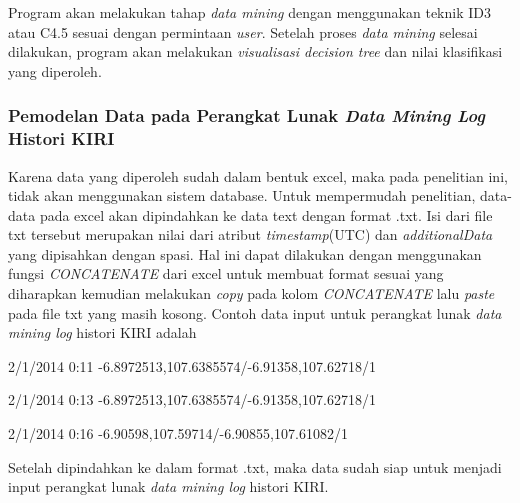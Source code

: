 Program akan melakukan tahap \textsl{data mining} dengan menggunakan teknik ID3 atau C4.5 sesuai dengan permintaan \textsl{user}. Setelah proses \textsl{data mining} selesai dilakukan, program akan melakukan \textsl{visualisasi decision tree} dan nilai klasifikasi yang diperoleh.  

\subsubsection{Pemodelan Data pada Perangkat Lunak \textsl{Data Mining Log} Histori KIRI}
Karena data yang diperoleh sudah dalam bentuk excel, maka pada penelitian ini, tidak akan menggunakan sistem database. Untuk mempermudah penelitian, data-data pada excel akan dipindahkan ke data text dengan format .txt. Isi dari file txt tersebut merupakan nilai dari atribut \textsl{timestamp}(UTC) dan \textsl{additionalData} yang dipisahkan dengan spasi. Hal ini dapat dilakukan dengan menggunakan fungsi \textsl{CONCATENATE} dari excel untuk membuat format sesuai yang diharapkan kemudian melakukan \textsl{copy} pada kolom \textsl{CONCATENATE} lalu \textsl{paste} pada file txt yang masih kosong. Contoh data input untuk perangkat lunak \textsl{data mining log} histori KIRI adalah

2/1/2014 0:11 -6.8972513,107.6385574/-6.91358,107.62718/1

2/1/2014 0:13 -6.8972513,107.6385574/-6.91358,107.62718/1

2/1/2014 0:16 -6.90598,107.59714/-6.90855,107.61082/1

Setelah dipindahkan ke dalam format .txt, maka data sudah siap untuk menjadi input perangkat lunak \textsl{data mining log} histori KIRI.

